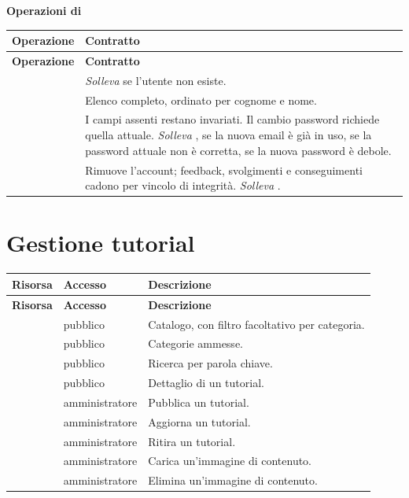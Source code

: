 \textbf{Operazioni di }

\begin{longtable}{@{}L{5.8cm} L{8.6cm}@{}}
\toprule
\textbf{Operazione} & \textbf{Contratto} \\
\midrule
\endfirsthead
\toprule
\textbf{Operazione} & \textbf{Contratto} \\
\midrule
\endhead
\bottomrule
\endlastfoot

 &
\emph{Solleva}  se l'utente non esiste. \\

 &
Elenco completo, ordinato per cognome e nome. \\

 &
I campi assenti restano invariati. Il cambio password richiede quella
attuale.
\emph{Solleva} ,  se la nuova email è già
in uso,  se la password attuale non è corretta,
 se la nuova password è debole. \\

 &
Rimuove l'account; feedback, svolgimenti e conseguimenti cadono per vincolo
di integrità. \emph{Solleva} . \\

\end{longtable}

\section{Gestione tutorial}

\begin{longtable}{@{}L{5.2cm} L{2.6cm} L{6.2cm}@{}}
\toprule
\textbf{Risorsa} & \textbf{Accesso} & \textbf{Descrizione} \\
\midrule
\endfirsthead
\toprule
\textbf{Risorsa} & \textbf{Accesso} & \textbf{Descrizione} \\
\midrule
\endhead
\bottomrule
\endlastfoot

 & pubblico &
Catalogo, con filtro facoltativo per categoria. \\
 & pubblico & Categorie ammesse. \\
 & pubblico & Ricerca per parola chiave. \\
 & pubblico & Dettaglio di un tutorial. \\
 & amministratore & Pubblica un tutorial. \\
 & amministratore & Aggiorna un tutorial. \\
 & amministratore & Ritira un tutorial. \\
 & amministratore & Carica un'immagine di contenuto. \\
 & amministratore & Elimina un'immagine di contenuto. \\

\end{longtable}

